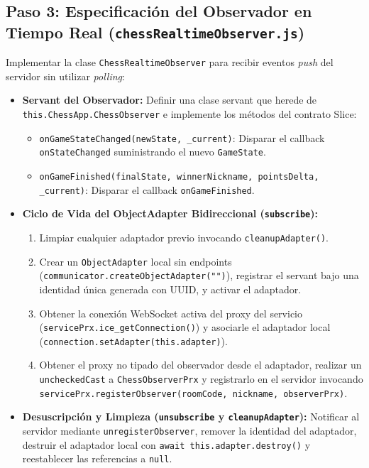 \documentclass[10pt,letterpaper]{article}
\begin{document}
\subsection*{Paso 3: Especificación del Observador en Tiempo Real (\texttt{chessRealtimeObserver.js})}
Implementar la clase \texttt{ChessRealtimeObserver} para recibir eventos \textit{push} del servidor sin utilizar \textit{polling}:
\begin{itemize}[leftmargin=*,itemsep=2pt]
    \item \textbf{Servant del Observador:} Definir una clase servant que herede de \texttt{this.ChessApp.ChessObserver} e implemente los métodos del contrato Slice:
    \begin{itemize}[leftmargin=*,itemsep=0pt]
        \item \texttt{onGameStateChanged(newState, \_current)}: Disparar el callback \texttt{onStateChanged} suministrando el nuevo \texttt{GameState}.
        \item \texttt{onGameFinished(finalState, winnerNickname, pointsDelta, \_current)}: Disparar el callback \texttt{onGameFinished}.
    \end{itemize}
    \item \textbf{Ciclo de Vida del ObjectAdapter Bidireccional (\texttt{subscribe}):}
    \begin{enumerate}[leftmargin=*,itemsep=1pt]
        \item Limpiar cualquier adaptador previo invocando \texttt{cleanupAdapter()}.
        \item Crear un \texttt{ObjectAdapter} local sin endpoints (\lstinline|communicator.createObjectAdapter("")|), registrar el servant bajo una identidad única generada con UUID, y activar el adaptador.
        \item Obtener la conexión WebSocket activa del proxy del servicio (\lstinline|servicePrx.ice_getConnection()|) y asociarle el adaptador local (\lstinline|connection.setAdapter(this.adapter)|).
        \item Obtener el proxy no tipado del observador desde el adaptador, realizar un \texttt{uncheckedCast} a \texttt{ChessObserverPrx} y registrarlo en el servidor invocando \lstinline|servicePrx.registerObserver(roomCode, nickname, observerPrx)|.
    \end{enumerate}
    \item \textbf{Desuscripción y Limpieza (\texttt{unsubscribe} y \texttt{cleanupAdapter}):} Notificar al servidor mediante \texttt{unregisterObserver}, remover la identidad del adaptador, destruir el adaptador local con \lstinline|await this.adapter.destroy()| y reestablecer las referencias a \texttt{null}.
\end{itemize}
\end{document}
